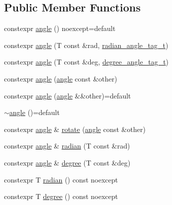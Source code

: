 \subsection*{Public Member Functions}
\begin{DoxyCompactItemize}
\item 
constexpr \mbox{\hyperlink{classpyrite_1_1math_1_1angle_a391868de4c78d823cf4a55373e28b90c}{angle}} () noexcept=default
\item 
constexpr \mbox{\hyperlink{classpyrite_1_1math_1_1angle_a2c9aeede6bd0edf739a440515ea20f0c}{angle}} (T const \&rad, \mbox{\hyperlink{structpyrite_1_1math_1_1radian__angle__tag__t}{radian\+\_\+angle\+\_\+tag\+\_\+t}})
\item 
constexpr \mbox{\hyperlink{classpyrite_1_1math_1_1angle_ab983c2beb0c1c127844dd437ffb5a6d6}{angle}} (T const \&deg, \mbox{\hyperlink{structpyrite_1_1math_1_1degree__angle__tag__t}{degree\+\_\+angle\+\_\+tag\+\_\+t}})
\item 
constexpr \mbox{\hyperlink{classpyrite_1_1math_1_1angle_a82354ef1bc05d04bc73c3959f30147c6}{angle}} (\mbox{\hyperlink{classpyrite_1_1math_1_1angle}{angle}} const \&other)
\item 
constexpr \mbox{\hyperlink{classpyrite_1_1math_1_1angle_a7aeda1e3d5aa652daf62bc0aeff89245}{angle}} (\mbox{\hyperlink{classpyrite_1_1math_1_1angle}{angle}} \&\&other)=default
\item 
\mbox{\hyperlink{classpyrite_1_1math_1_1angle_a53b066dbf9792cf5483ab6665a0f31da}{$\sim$angle}} ()=default
\item 
constexpr \mbox{\hyperlink{classpyrite_1_1math_1_1angle}{angle}} \& \mbox{\hyperlink{classpyrite_1_1math_1_1angle_a3beefc40aadf5528ee5fd76823d98420}{rotate}} (\mbox{\hyperlink{classpyrite_1_1math_1_1angle}{angle}} const \&other)
\item 
constexpr \mbox{\hyperlink{classpyrite_1_1math_1_1angle}{angle}} \& \mbox{\hyperlink{classpyrite_1_1math_1_1angle_a2fab8f4261d509f5272e9f9ebec19028}{radian}} (T const \&rad)
\item 
constexpr \mbox{\hyperlink{classpyrite_1_1math_1_1angle}{angle}} \& \mbox{\hyperlink{classpyrite_1_1math_1_1angle_a7e27daa8c8cb81986a146495664dfaba}{degree}} (T const \&deg)
\item 
constexpr T \mbox{\hyperlink{classpyrite_1_1math_1_1angle_a01c42dc88f49b1b945e187aa2c5f190a}{radian}} () const noexcept
\item 
constexpr T \mbox{\hyperlink{classpyrite_1_1math_1_1angle_a52d68b9f0b2bedfed7fa09782dba0e82}{degree}} () const noexcept

\end{DoxyCompactItemize}
